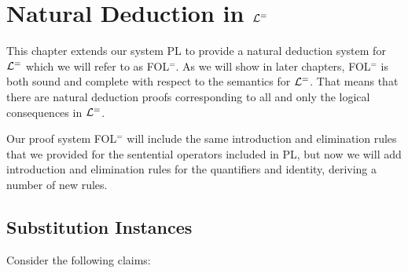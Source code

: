 ﻿%
\chapter{Natural Deduction in $\mathcal{L}^{=}$}
\label{ch.FOL-deduction}



This chapter extends our system PL to provide a natural deduction system for $\mathcal{L}^{=}$ which we will refer to as FOL$^=$.
As we will show in later chapters, FOL$^=$ is both sound and complete with respect to the semantics for $\mathcal{L}^{=}$.
That means that there are natural deduction proofs corresponding to all and only the logical consequences in $\mathcal{L}^{=}$.

Our proof system FOL$^=$ will include the same introduction and elimination rules that we provided for the sentential operators included in PL, but now we will add introduction and elimination rules for the quantifiers and identity, deriving a number of new rules.



\section{Substitution Instances}


Consider the following claims:

\begin{earg} \label{strength}
\end{earg}

